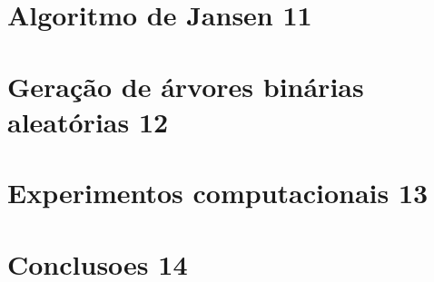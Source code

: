 \documentclass[a4paper,12pt]{article}
\begin{document}
\section {Algoritmo de Jansen 11}



\section {Geração de árvores binárias aleatórias 12}



\section {Experimentos computacionais 13}



\section {Conclusoes 14}



\newpage


\end{document}
